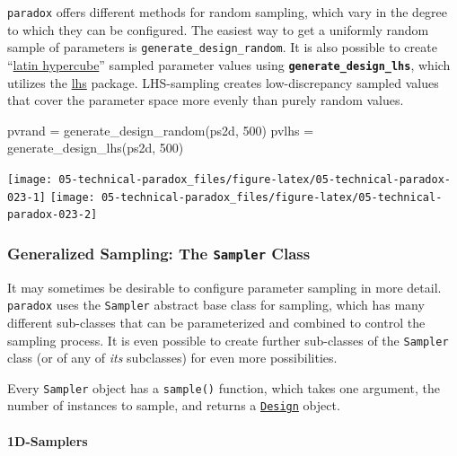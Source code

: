 \documentclass[
]{scrbook}
\newenvironment{Shaded}{\begin{snugshade}}{\end{snugshade}}
\newcommand{\DecValTok}[1]{\textcolor[rgb]{0.00,0.00,0.81}{#1}}
\newcommand{\FunctionTok}[1]{\textcolor[rgb]{0.00,0.00,0.00}{#1}}
\newcommand{\NormalTok}[1]{#1}
\newcommand{\OtherTok}[1]{\textcolor[rgb]{0.56,0.35,0.01}{#1}}
\renewenvironment{Shaded} {\begin{snugshade}\small} {\end{snugshade}}
\begin{document}
\texttt{paradox} offers different methods for random sampling, which vary in the degree to which they can be configured.
The easiest way to get a uniformly random sample of parameters is \texttt{generate\_design\_random}.
It is also possible to create ``\href{https://en.wikipedia.org/wiki/Latin_hypercube_sampling}{latin hypercube}'' sampled parameter values using \textbf{\texttt{generate\_design\_lhs}}, which utilizes the \href{https://cran.r-project.org/package=lhs}{lhs} package.
LHS-sampling creates low-discrepancy sampled values that cover the parameter space more evenly than purely random values.

\begin{Shaded}
\begin{Highlighting}[]
\NormalTok{pvrand }\OtherTok{=} \FunctionTok{generate\_design\_random}\NormalTok{(ps2d, }\DecValTok{500}\NormalTok{)}
\NormalTok{pvlhs }\OtherTok{=} \FunctionTok{generate\_design\_lhs}\NormalTok{(ps2d, }\DecValTok{500}\NormalTok{)}
\end{Highlighting}
\end{Shaded}

\begin{center}\texttt{[image: 05-technical-paradox\_files/figure-latex/05-technical-paradox-023-1]} \texttt{[image: 05-technical-paradox\_files/figure-latex/05-technical-paradox-023-2]} \end{center}

\hypertarget{generalized-sampling-the-sampler-class}{%
\subsubsection{\texorpdfstring{Generalized Sampling: The \texttt{Sampler} Class}{Generalized Sampling: The Sampler Class}}\label{generalized-sampling-the-sampler-class}}

It may sometimes be desirable to configure parameter sampling in more detail.
\texttt{paradox} uses the \texttt{Sampler} abstract base class for sampling, which has many different sub-classes that can be parameterized and combined to control the sampling process.
It is even possible to create further sub-classes of the \texttt{Sampler} class (or of any of \emph{its} subclasses) for even more possibilities.

Every \texttt{Sampler} object has a \texttt{sample()} function, which takes one argument, the number of instances to sample, and returns a \protect\hyperlink{parameter-designs}{\texttt{Design}} object.

\hypertarget{d-samplers}{%
\paragraph{1D-Samplers}\label{d-samplers}}
\end{document}
